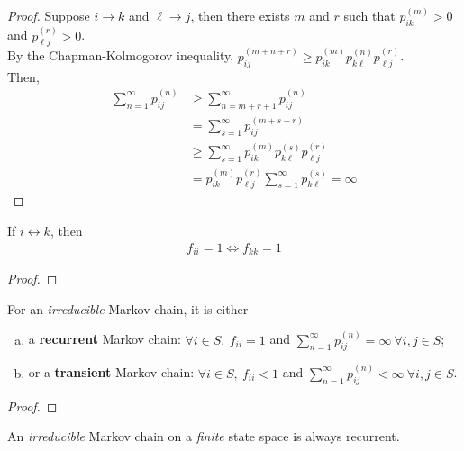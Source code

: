 \documentclass{article}
\newcommand{\upn}[0]{^{(n)}}
\begin{document}
    \begin{proof}
    	Suppose $i \to k$ and $\ell \to j$, then there exists $m$ and $r$ such that $p_{ik}^{(m)} > 0$ and $p_{\ell j}^{(r)} > 0$. \\
    	By the Chapman-Kolmogorov inequality, $p_{ij}^{(m+n+r)} \geq p_{ik}^{(m)} p_{k \ell}^{(n)} p_{\ell j}^{(r)}$. \\
    	Then,
    	\begin{align}
    		\sum_{n=1}^\infty p_{ij}\upn
    		&\geq \sum_{n=m+r+1}^\infty p_{ij}\upn \\
    		&= \sum_{s=1}^\infty p_{ij}^{(m+s+r)} \\
    		&\geq \sum_{s=1}^\infty p_{ik}^{(m)} p_{k \ell}^{(s)} p_{\ell j}^{(r)} \\
    		&= p_{ik}^{(m)} p_{\ell j}^{(r)} \sum_{s=1}^\infty p_{k \ell}^{(s)} = \infty
    	\end{align}
    \end{proof}
    
    \begin{theorem}
    	If $i \leftrightarrow k$, then
    	\begin{align}
    		f_{ii} = 1 \iff f_{kk} = 1
    	\end{align}
    \end{theorem}
    
    \begin{proof}
    \end{proof}
    
    \begin{theorem}
    	For an \emph{irreducible} Markov chain, it is either
    	\begin{enumerate}[(a)]
    		\item a \textbf{recurrent} Markov chain: $\forall i \in S,\ f_{ii} = 1$ and  $\sum_{n=1}^\infty p_{ij}\upn = \infty\ \forall i, j \in S$;
    		\item or a \textbf{transient} Markov chain: $\forall i \in S,\ f_{ii} < 1$ and $\sum_{n=1}^\infty p_{ij}\upn < \infty\ \forall i, j \in S$.
    	\end{enumerate}
    \end{theorem}
    
    \begin{proof}
    \end{proof}
    
    \begin{theorem}
    	An \emph{irreducible} Markov chain on a \emph{finite} state space is always recurrent.
    \end{theorem}
    
\end{document}
